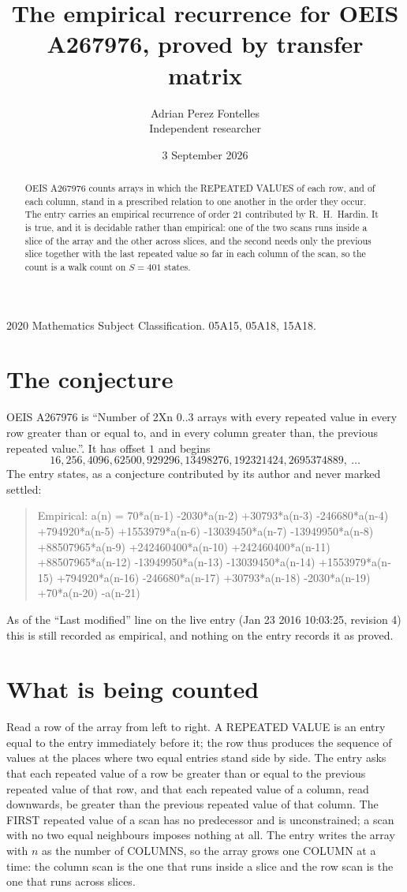 \documentclass[11pt,a4paper]{article}
\title{The empirical recurrence for OEIS A267976, proved by transfer matrix}
\author{Adrian Perez Fontelles\\ \small Independent researcher}
\date{3 September 2026}
\theoremstyle{plain}
\theoremstyle{definition}
\begin{document}
\maketitle

\begin{abstract}
OEIS A267976 counts arrays in which the REPEATED VALUES of each row, and of each column, stand in a
prescribed relation to one another in the order they occur. The entry carries an empirical
recurrence of order $21$ contributed by R.~H.~Hardin. It is true, and it is decidable
rather than empirical: one of the two scans runs inside a slice of the array and the other
across slices, and the second needs only the previous slice together with the last repeated
value so far in each column of the scan, so the count is a walk count on $S=401$ states.
\end{abstract}

\noindent\small 2020 Mathematics Subject Classification. 05A15, 05A18, 15A18.\normalsize

\section{The conjecture}

OEIS A267976 is ``Number of 2Xn 0..3 arrays with every repeated value in every row greater than or equal to, and in every column greater than, the previous repeated value.''. It has offset $1$ and begins
\[
16, 256, 4096, 62500, 929296, 13498276, 192321424, 2695374889,\ \dots
\]
The entry states, as a conjecture contributed by its author and never marked settled:
\begin{quote}
Empirical: a(n) = 70*a(n-1) -2030*a(n-2) +30793*a(n-3) -246680*a(n-4) +794920*a(n-5) +1553979*a(n-6) -13039450*a(n-7) -13949950*a(n-8) +88507965*a(n-9) +242460400*a(n-10) +242460400*a(n-11) +88507965*a(n-12) -13949950*a(n-13) -13039450*a(n-14) +1553979*a(n-15) +794920*a(n-16) -246680*a(n-17) +30793*a(n-18) -2030*a(n-19) +70*a(n-20) -a(n-21)
\end{quote}
As of the ``Last modified'' line on the live entry (Jan 23 2016 10:03:25, revision 4) this is still
recorded as empirical, and nothing on the entry records it as proved.

\section{What is being counted}

Read a row of the array from left to right. A REPEATED VALUE is an entry equal to the entry
immediately before it; the row thus produces the sequence of values at the places where two
equal entries stand side by side. The entry asks that each repeated value of a row be
greater than or equal to the previous repeated value of that row, and that each repeated value of a column,
read downwards, be greater than the previous repeated value of that column. The FIRST repeated
value of a scan has no predecessor and is unconstrained; a scan with no two equal neighbours
imposes nothing at all. The entry writes the array with $n$ as the number of COLUMNS, so the array grows one COLUMN at a time: the column scan is the one that runs inside a slice and the row scan is the one that runs across slices.
\end{document}
